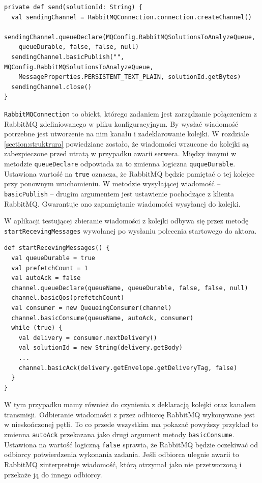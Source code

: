 \documentclass[brudnopis]{xmgr}
\begin{document}
\begin{verbatim}
private def send(solutionId: String) {
  val sendingChannel = RabbitMQConnection.connection.createChannel()
  sendingChannel.queueDeclare(MQConfig.RabbitMQSolutionsToAnalyzeQueue, 
    queueDurable, false, false, null)
  sendingChannel.basicPublish("", MQConfig.RabbitMQSolutionsToAnalyzeQueue, 
    MessageProperties.PERSISTENT_TEXT_PLAIN, solutionId.getBytes)
  sendingChannel.close()
}
\end{verbatim}

\texttt{RabbitMQConnection} to obiekt, którego zadaniem jest zarządzanie połączeniem z RabbitMQ zdefiniowanego w pliku konfiguracyjnym. By wysłać wiadomość potrzebne jest utworzenie na nim kanału i zadeklarowanie kolejki. W rozdziale \ref{section:struktrura} powiedziane zostało, że wiadomości wrzucone do kolejki są zabezpieczone przed utratą w przypadku awarii serwera. Między innymi w metodzie \texttt{queueDeclare} odpowiada za to zmienna logiczna \texttt{ququeDurable}. Ustawiona wartość na \texttt{true} oznacza, że RabbitMQ będzie pamiętać o tej kolejce przy ponownym uruchomieniu. W metodzie wysyłającej wiadomość -- \texttt{basicPublish} -- drugim argumentem jest ustawienie pochodzące z klienta RabbitMQ. Gwarantuje ono zapamiętanie wiadomości wysyłanej do kolejki.

W aplikacji testującej zbieranie wiadomości z kolejki odbywa się przez metodę \texttt{startRecevingMessages} wywołanej po wysłaniu polecenia startowego do aktora.

\begin{verbatim}
def startRecevingMessages() {
  val queueDurable = true
  val prefetchCount = 1
  val autoAck = false
  channel.queueDeclare(queueName, queueDurable, false, false, null)
  channel.basicQos(prefetchCount)
  val consumer = new QueueingConsumer(channel)
  channel.basicConsume(queueName, autoAck, consumer)
  while (true) {
    val delivery = consumer.nextDelivery()
    val solutionId = new String(delivery.getBody)
    ...
    channel.basicAck(delivery.getEnvelope.getDeliveryTag, false)
  }
}
\end{verbatim}

W tym przypadku mamy również do czynienia z deklaracją kolejki oraz kanałem transmisji. Odbieranie wiadomości z przez odbiorcę RabbitMQ wykonywane jest w nieskończonej pętli. To co przede wszystkim ma pokazać powyższy przykład to zmienna \texttt{autoAck} przekazana jako drugi argument metody \texttt{basicConsume}. Ustawiona na wartość logiczną \texttt{false} sprawia, że RabbitMQ będzie oczekiwać od odbiorcy potwierdzenia wykonania zadania. Jeśli odbiorca ulegnie awarii to RabbitMQ zinterpretuje wiadomość, którą otrzymał jako nie przetworzoną i przekaże ją do innego odbiorcy.
\end{document}
